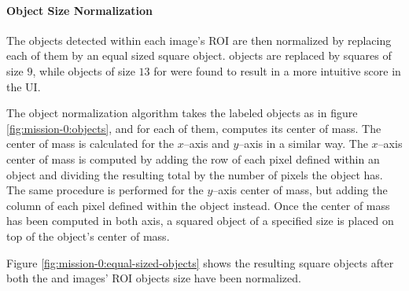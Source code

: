 \paragraph{Object Size Normalization} \label{paragraph:case-study:impl:object-normalization}
The objects detected within each image's ROI are then normalized by replacing each of them by an equal sized square object. \usno objects are replaced by squares of size $9$, while objects of size $13$ for \panstarrs were found to result in a more intuitive score in the UI. 

The object normalization algorithm takes the labeled objects as in figure \ref{fig:mission-0:objects}, and for each of them, computes its center of mass. The center of mass is calculated for the $x$--axis and $y$--axis in a similar way. The $x$--axis center of mass is computed by adding the row of each pixel defined within an object and dividing the resulting total by the number of pixels the object has. The same procedure is performed for the $y$--axis center of mass, but adding the column of each pixel defined within the object instead. Once the center of mass has been computed in both axis, a squared object of a specified size is placed on top of the object's center of mass. 

Figure \ref{fig:mission-0:equal-sized-objects} shows the resulting square objects after both the \usno and \panstarrs images' ROI objects size have been normalized.

